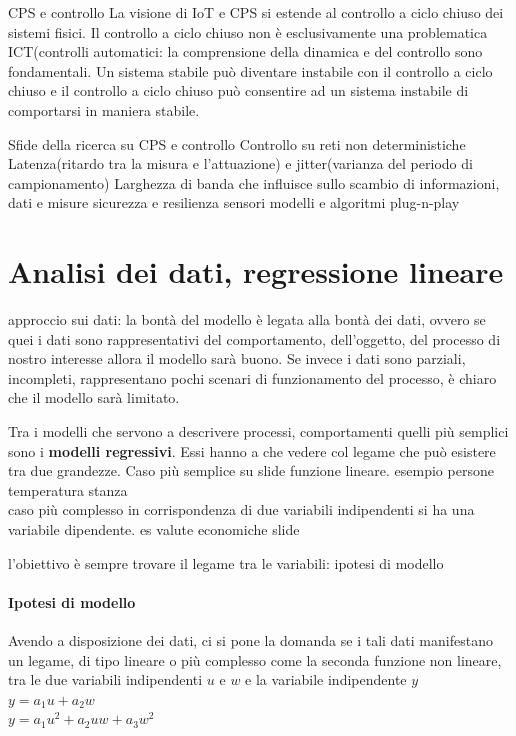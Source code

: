 \documentclass[10pt,a4paper]{article}
\begin{document}
CPS e controllo
La visione di IoT e CPS si estende al controllo a ciclo chiuso dei sistemi fisici.
Il controllo a ciclo chiuso non è esclusivamente una problematica ICT(controlli automatici: la comprensione della dinamica e del controllo sono fondamentali.
Un sistema stabile può diventare instabile con il controllo a ciclo chiuso e il controllo a ciclo chiuso può consentire ad un sistema instabile di comportarsi in maniera stabile.


Sfide della ricerca su CPS e controllo
Controllo su reti non deterministiche
Latenza(ritardo tra la misura e l'attuazione) e jitter(varianza del periodo di campionamento)
Larghezza di banda che influisce sullo scambio di informazioni, dati e misure
sicurezza e resilienza
sensori modelli e algoritmi plug-n-play


\section{Analisi dei dati, regressione lineare}
approccio sui dati:
la bontà del modello è legata alla bontà dei dati, ovvero se quei i dati sono rappresentativi del comportamento, dell'oggetto, del processo di nostro interesse allora il modello sarà buono. Se invece i dati sono parziali, incompleti, rappresentano pochi scenari di funzionamento del processo, è chiaro che il modello sarà limitato.

Tra i modelli che servono a descrivere processi, comportamenti quelli più semplici sono i \textbf{modelli regressivi}. Essi hanno a che vedere col legame che può esistere tra due grandezze.
Caso più semplice su slide funzione lineare. esempio persone temperatura stanza\\
caso più complesso in corrispondenza di due variabili indipendenti si ha una variabile dipendente. es valute economiche slide

l'obiettivo è sempre trovare il legame tra le variabili: ipotesi di modello

\paragraph{Ipotesi di modello\\}
Avendo a disposizione dei dati, ci si pone la domanda se i tali dati manifestano un legame, di tipo lineare o più complesso come la seconda funzione non lineare, tra le due variabili indipendenti $ u $ e $ w $ e la variabile indipendente $ y $ \\
$ y = a_{1}u+a_{2}w $\\
$ y = a_{1}u^{2}+a_{2}uw+a_{3}w^{2} $
\end{document}

